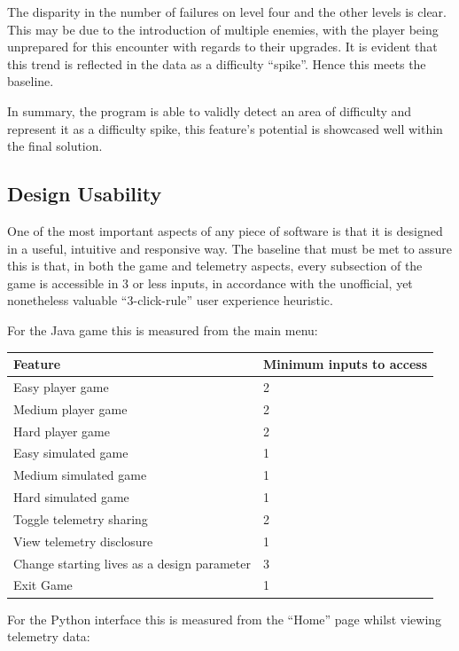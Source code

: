 The disparity in the number of failures on level four and the other levels
is clear. This may be due to the introduction of multiple enemies, with the
player being unprepared for this encounter with regards to their upgrades.
It is evident that this trend is reflected in the data as a difficulty 
``spike''. Hence this meets the baseline.

In summary, the program is able to validly detect an area of difficulty
and represent it as a difficulty spike, this feature's potential is showcased 
well within the final solution.

\subsection{Design Usability}

One of the most important aspects of any piece of software is that it is
designed in a useful, intuitive and responsive way. The baseline that
must be met to assure this is that, in both the game and telemetry
aspects, every subsection of the game is accessible in 3 or less inputs, in
accordance with the unofficial, yet nonetheless valuable
``3-click-rule'' user experience heuristic.

For the Java game this is measured from the main menu:

\begin{longtable}{p{} p{}}
\toprule
\textbf{Feature} & \textbf{Minimum inputs to access} \\
\midrule
\endhead
Easy player game & 2 \\
Medium player game & 2 \\
Hard player game & 2 \\
Easy simulated game & 1 \\
Medium simulated game & 1 \\
Hard simulated game & 1 \\
Toggle telemetry sharing & 2 \\
View telemetry disclosure & 1 \\
Change starting lives as a design parameter & 3 \\
Exit Game & 1 \\
\bottomrule
\end{longtable}

For the Python interface this is measured from the ``Home'' page whilst
viewing telemetry data:

